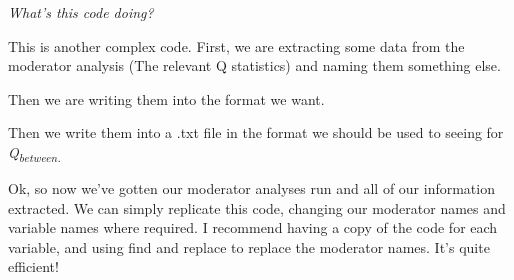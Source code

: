 \documentclass[
]{book}
\newenvironment{Shaded}{\begin{snugshade}}{\end{snugshade}}
\newcommand{\AttributeTok}[1]{\textcolor[rgb]{0.13,0.29,0.53}{#1}}
\newcommand{\CommentTok}[1]{\textcolor[rgb]{0.56,0.35,0.01}{\textit{#1}}}
\newcommand{\ConstantTok}[1]{\textcolor[rgb]{0.56,0.35,0.01}{#1}}
\newcommand{\DecValTok}[1]{\textcolor[rgb]{0.00,0.00,0.81}{#1}}
\newcommand{\FunctionTok}[1]{\textcolor[rgb]{0.13,0.29,0.53}{\textbf{#1}}}
\newcommand{\NormalTok}[1]{#1}
\newcommand{\OtherTok}[1]{\textcolor[rgb]{0.56,0.35,0.01}{#1}}
\newcommand{\SpecialCharTok}[1]{\textcolor[rgb]{0.81,0.36,0.00}{\textbf{#1}}}
\newcommand{\StringTok}[1]{\textcolor[rgb]{0.31,0.60,0.02}{#1}}
\begin{document}
\begin{Shaded}
\end{Shaded}

\emph{What's this code doing?}

This is another complex code. First, we are extracting some data from the moderator analysis (The relevant Q statistics) and naming them something else.

Then we are writing them into the format we want.

Then we write them into a .txt file in the format we should be used to seeing for \emph{Q\textsubscript{between.}}

Ok, so now we've gotten our moderator analyses run and all of our information extracted. We can simply replicate this code, changing our moderator names and variable names where required. I recommend having a copy of the code for each variable, and using find and replace to replace the moderator names. It's quite efficient!
\end{document}
